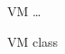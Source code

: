 \begin{figure}[H]
\centering
\begin{class}{VM}
\dots
\end{class}
\caption{VM class}
\label{oz_vm_class}
\end{figure}